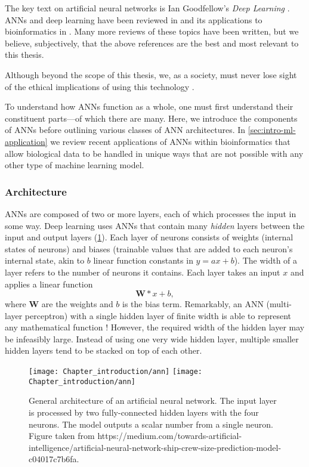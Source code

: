 The key text on artificial neural networks is Ian Goodfellow's \emph{Deep Learning} \cite{Goodfellow2016}. ANNs and deep learning have been reviewed in \cite{LeCun2015,Schmidhuber2015} and its applications to bioinformatics in \cite{Angermueller2016,Min2016,Baldi2018,Wainberg2018,Ching2017}. Many more reviews of these topics have been written, but we believe, subjectively, that the above references are the best and most relevant to this thesis.

Although beyond the scope of this thesis, we, as a society, must never lose sight of the ethical implications of using this technology \cite{Bostrom2017,Tegmark2017,Russel2019}.

To understand how ANNs function as a whole, one must first understand their constituent parts---of which there are many. Here, we introduce the components of ANNs before outlining various classes of ANN architectures. In \ref{sec:intro-ml-application} we review recent applications of ANNs within bioinformatics that allow biological data to be handled in unique ways that are not possible with any other type of machine learning model.

\subsubsection{Architecture}

ANNs are composed of two or more layers, each of which processes the input in some way. Deep learning uses ANNs that contain many \emph{hidden} layers between the input and output layers (\ref{fig:ann}). Each layer of neurons consists of weights (internal states of neurons) and biases (trainable values that are added to each neuron's internal state, akin to $b$ linear function constants in $y = ax+b$). The width of a layer refers to the number of neurons it contains. Each layer takes an input $x$ and applies a linear function
\[
\mathbf{W}*x+b,
\]
where $\mathbf{W}$ are the weights and $b$ is the bias term. Remarkably, an ANN (multi-layer perceptron) with a single hidden layer of finite width is able to represent any mathematical function \cite{Lin2016}! However, the required width of the hidden layer may be infeasibly large. Instead of using one very wide hidden layer, multiple smaller hidden layers tend to be stacked on top of each other.

\begin{figure}[!hbt]
    \centering
    \ifredact
        \texttt{[image: Chapter\_introduction/ann]}
    \else
        \texttt{[image: Chapter\_introduction/ann]}
    \fi
    \caption{%
        General architecture of an artificial neural network.
        The input layer is processed by two fully-connected hidden layers with the four neurons.
        The model outputs a scalar number from a single neuron.
        Figure taken from https://medium.com/towards-artificial-intelligence/artificial-neural-network-ship-crew-size-prediction-model-c04017c7b6fa.
    }
    \label{fig:ann}
\end{figure}

